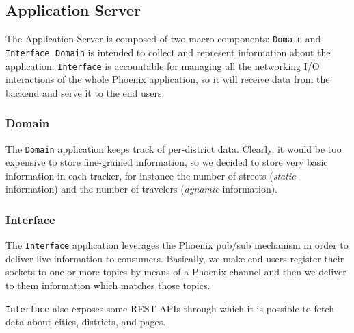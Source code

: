 \subsection{Application Server}\label{sec:sol-des-as}

The Application Server is composed of two macro-components: \texttt{Domain}
and \texttt{Interface}.
\texttt{Domain} is intended to collect and represent information about the
application.
\texttt{Interface} is accountable for managing all the networking I/O
interactions of the whole Phoenix application, so it will receive data from the
backend and serve it to the end users.

\subsubsection{Domain}

The \texttt{Domain} application keeps track of per-district data.
Clearly, it would be too expensive to store fine-grained information, so we
decided to store very basic information in each tracker, for instance the
number of streets (\textit{static} information) and the number of travelers
(\textit{dynamic} information).

\subsubsection{Interface}
The \texttt{Interface} application leverages the Phoenix pub/sub
mechanism in order to deliver live information to consumers.
Basically, we make end users register their sockets to one or more topics by
means of a Phoenix channel and then we deliver to them information which
matches those topics.

\texttt{Interface} also exposes some REST APIs through which it is possible to
fetch data about cities, districts, and pages.
